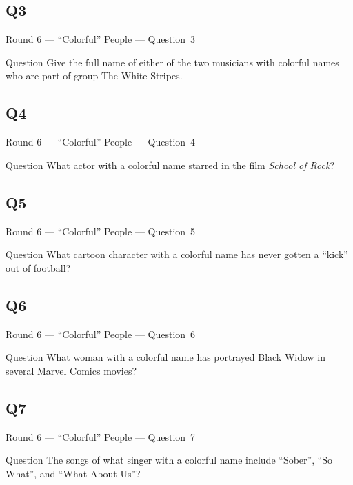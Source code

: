\documentclass[11pt]{beamer}
\begin{document}
\subsection*{Q3}
\begin{frame}[t]{Round 6 --- ``Colorful'' People --- \mbox{Question 3}}
\vspace{-0.5em}
\begin{block}{Question}
Give the full name of either of the two musicians with colorful names who are part of group The White Stripes.
\end{block}
\end{frame}
\subsection*{Q4}
\begin{frame}[t]{Round 6 --- ``Colorful'' People --- \mbox{Question 4}}
\vspace{-0.5em}
\begin{block}{Question}
What actor with a colorful name starred in the film \emph{School of Rock}?
\end{block}
\end{frame}
\subsection*{Q5}
\begin{frame}[t]{Round 6 --- ``Colorful'' People --- \mbox{Question 5}}
\vspace{-0.5em}
\begin{block}{Question}
What cartoon character with a colorful name has never gotten a ``kick'' out of football?
\end{block}
\end{frame}
\subsection*{Q6}
\begin{frame}[t]{Round 6 --- ``Colorful'' People --- \mbox{Question 6}}
\vspace{-0.5em}
\begin{block}{Question}
What woman with a colorful name has portrayed Black Widow in several Marvel Comics movies?
\end{block}
\end{frame}
\subsection*{Q7}
\begin{frame}[t]{Round 6 --- ``Colorful'' People --- \mbox{Question 7}}
\vspace{-0.5em}
\begin{block}{Question}
The songs of what singer with a colorful name include ``Sober'', ``So What'', and ``What About Us''?
\end{block}
\end{frame}
\end{document}
